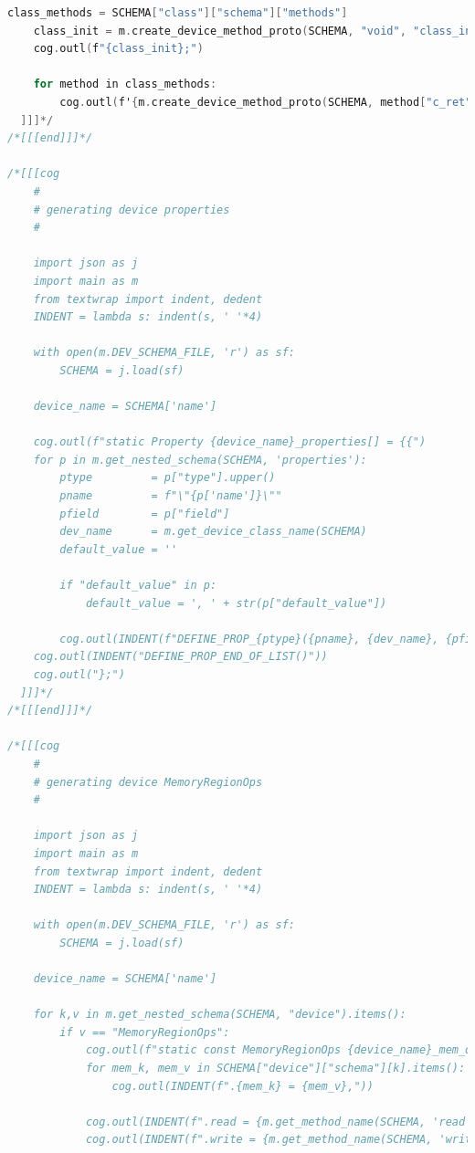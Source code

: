 \begin{lstlisting}[language={C},basicstyle=\tiny,stepnumber=1,caption={Шаблон устройства},label={lst:core.template.c}]
    class_methods = SCHEMA["class"]["schema"]["methods"]
    class_init = m.create_device_method_proto(SCHEMA, "void", "class_init", "ObjectClass *oc, void *data")
    cog.outl(f"{class_init};")

    for method in class_methods:
        cog.outl(f'{m.create_device_method_proto(SCHEMA, method["c_ret"], method["c_name"], method["c_args"])};')
  ]]]*/
/*[[[end]]]*/

/*[[[cog
    #
    # generating device properties
    #

    import json as j
    import main as m
    from textwrap import indent, dedent
    INDENT = lambda s: indent(s, ' '*4)

    with open(m.DEV_SCHEMA_FILE, 'r') as sf:
        SCHEMA = j.load(sf)

    device_name = SCHEMA['name']

    cog.outl(f"static Property {device_name}_properties[] = {{")
    for p in m.get_nested_schema(SCHEMA, 'properties'):
        ptype         = p["type"].upper()
        pname         = f"\"{p['name']}\""
        pfield        = p["field"]
        dev_name      = m.get_device_class_name(SCHEMA)
        default_value = ''

        if "default_value" in p:
            default_value = ', ' + str(p["default_value"])

        cog.outl(INDENT(f"DEFINE_PROP_{ptype}({pname}, {dev_name}, {pfield}{default_value}),"))
    cog.outl(INDENT("DEFINE_PROP_END_OF_LIST()"))
    cog.outl("};")
  ]]]*/
/*[[[end]]]*/

/*[[[cog
    #
    # generating device MemoryRegionOps
    #

    import json as j
    import main as m
    from textwrap import indent, dedent
    INDENT = lambda s: indent(s, ' '*4)

    with open(m.DEV_SCHEMA_FILE, 'r') as sf:
        SCHEMA = j.load(sf)

    device_name = SCHEMA['name']

    for k,v in m.get_nested_schema(SCHEMA, "device").items():
        if v == "MemoryRegionOps":
            cog.outl(f"static const MemoryRegionOps {device_name}_mem_ops = {{")
            for mem_k, mem_v in SCHEMA["device"]["schema"][k].items():
                cog.outl(INDENT(f".{mem_k} = {mem_v},"))

            cog.outl(INDENT(f".read = {m.get_method_name(SCHEMA, 'read')},"))
            cog.outl(INDENT(f".write = {m.get_method_name(SCHEMA, 'write')},"))


\end{lstlisting}
